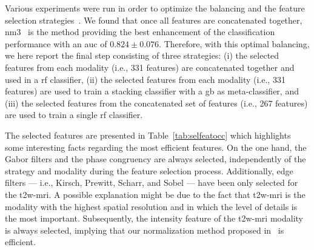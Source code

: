 \documentclass[conference]{sty/ieeeconf}
\begin{document}
Various experiments were run in order to optimize the balancing and
the feature selection strategies~\cite{Lemaitre2016thesis}.
We found that once all features are concatenated together,
\ac{nm3}~\cite{mani2003knn} is the method providing the best
enhancement of the classification performance with an \ac{auc} of $0.824 \pm
0.076$.
Therefore, with this optimal balancing, we here report the
final step consisting of three strategies:
(i) the selected features from each modality (i.e., 331 features) are
concatenated together and used in a \ac{rf} classifier,
(ii) the selected features from each modality (i.e., 331 features) are
used to train a stacking classifier with a \ac{gb} as meta-classifier, and
(iii) the selected features from the concatenated set of features
(i.e., 267 features) are used to train a single \ac{rf} classifier.

The selected features are presented in Table~\ref{tab:selfeatocc} which
highlights some interesting facts regarding the most efficient features.
On the one hand, the Gabor filters and the phase congruency are always
selected, independently of the strategy and modality during the feature
selection process.
Additionally, edge filters --- i.e., Kirsch, Prewitt, Scharr, and Sobel ---
have been only selected for the \ac{t2w}-\ac{mri}.
A possible explanation might be due to the fact that \ac{t2w}-\ac{mri} is the
modality with the highest spatial resolution and in which the level of details
is the most important.
Subsequently, the intensity feature of the \ac{t2w}-\ac{mri} modality is always
selected, implying that our normalization method proposed
in~\cite{lemaitre2016normalization} is efficient.
\end{document}
